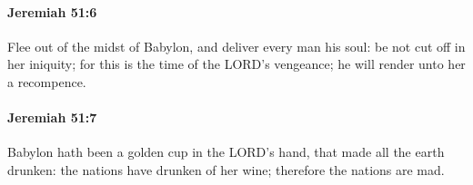 		\paragraph{Jeremiah 51:6} %
			\label{JEREMIAH-51-6}

			Flee out of the midst of Babylon, and deliver every man his soul: be not cut off in her iniquity; for this is the time of the LORD’s vengeance; he will render unto her a recompence.


		\paragraph{Jeremiah 51:7} %
			\label{JEREMIAH-51-7}

			Babylon hath been a golden cup in the LORD’s hand, that made all the earth drunken: the nations have drunken of her wine; therefore the nations are mad.


